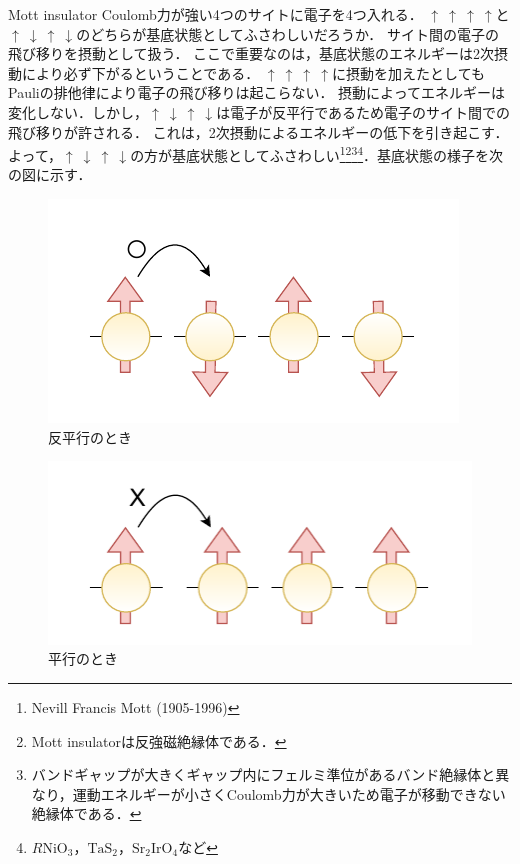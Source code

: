 \documentclass{report}
\begin{document}
  \begin{myex}{Mott insulator}{}
    Coulomb力が強い4つのサイトに電子を4つ入れる．
    $\uparrow \ \uparrow\ \uparrow\ \uparrow$と$\uparrow\ \downarrow\ \uparrow\ \downarrow$のどちらが基底状態としてふさわしいだろうか．
    サイト間の電子の飛び移りを摂動として扱う．
    ここで重要なのは，基底状態のエネルギーは2次摂動により必ず下がるということである．
    $\uparrow \ \uparrow\ \uparrow\ \uparrow$に摂動を加えたとしてもPauliの排他律により電子の飛び移りは起こらない．
    摂動によってエネルギーは変化しない．しかし，$\uparrow\ \downarrow\ \uparrow\ \downarrow$は電子が反平行であるため電子のサイト間での飛び移りが許される．
    これは，2次摂動によるエネルギーの低下を引き起こす．
    よって，$\uparrow\ \downarrow\ \uparrow\ \downarrow$の方が基底状態としてふさわしい\footnote{
      Nevill Francis Mott (1905-1996)
    }\footnote{
      Mott insulatorは反強磁絶縁体である．
    }\footnote{
      バンドギャップが大きくギャップ内にフェルミ準位があるバンド絶縁体と異なり，運動エネルギーが小さくCoulomb力が大きいため電子が移動できない絶縁体である．
    }\footnote{
      $R\mathrm{NiO_3，TaS_2，Sr_2IrO_4}$など
    }．基底状態の様子を次の図に示す．

    \begin{figure}[H]
      \centering
      \includegraphics[width=0.6\columnwidth]{fig/mott_antipara.drawio.pdf}
      \caption{反平行のとき}
      \label{mottantipara}
    \end{figure}

    \begin{figure}[H]
      \centering
      \includegraphics[width=0.6\columnwidth]{fig/mott_para.pdf}
      \caption{平行のとき}
      \label{mottpara}
    \end{figure}
   \end{myex}
\end{document}
